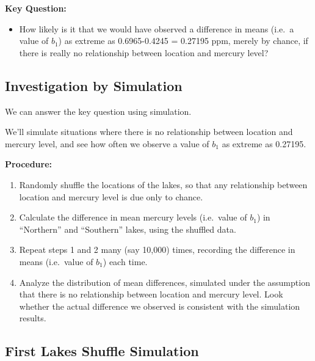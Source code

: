 \documentclass[]{book}
\newenvironment{Shaded}{\begin{snugshade}}{\end{snugshade}}
\newcommand{\KeywordTok}[1]{\textcolor[rgb]{0.13,0.29,0.53}{\textbf{#1}}}
\newcommand{\DecValTok}[1]{\textcolor[rgb]{0.00,0.00,0.81}{#1}}
\newcommand{\StringTok}[1]{\textcolor[rgb]{0.31,0.60,0.02}{#1}}
\newcommand{\OperatorTok}[1]{\textcolor[rgb]{0.81,0.36,0.00}{\textbf{#1}}}
\newcommand{\NormalTok}[1]{#1}
\providecommand{\tightlist}{%
  \setlength{\itemsep}{0pt}\setlength{\parskip}{0pt}}
\begin{document}
\textbf{Key Question:}

\begin{itemize}
\tightlist
\item
  How likely is it that we would have observed a difference in means
  (i.e.~a value of \(b_1\)) as extreme as 0.6965-0.4245 = 0.27195 ppm,
  merely by chance, if there is really no relationship between location
  and mercury level?
\end{itemize}

\subsection{Investigation by
Simulation}\label{investigation-by-simulation-1}

We can answer the key question using simulation.

We'll simulate situations where there is no relationship between
location and mercury level, and see how often we observe a value of
\(b_1\) as extreme as 0.27195.

\textbf{Procedure:}

\begin{enumerate}
\def\labelenumi{\arabic{enumi}.}
\item
  Randomly shuffle the locations of the lakes, so that any relationship
  between location and mercury level is due only to chance.
\item
  Calculate the difference in mean mercury levels (i.e.~value of
  \(b_1\)) in ``Northern'' and ``Southern'' lakes, using the shuffled
  data.
\item
  Repeat steps 1 and 2 many (say 10,000) times, recording the difference
  in means (i.e.~value of \(b_1\)) each time.\\
\item
  Analyze the distribution of mean differences, simulated under the
  assumption that there is no relationship between location and mercury
  level. Look whether the actual difference we observed is consistent
  with the simulation results.
\end{enumerate}

\subsection{First Lakes Shuffle
Simulation}\label{first-lakes-shuffle-simulation}

\begin{Shaded}
\end{Shaded}
\end{document}
